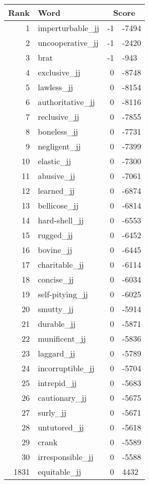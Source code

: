 \begin{longtable}[!htbp]{| rlr@{.}l |}
    \hline
    \textbf{Rank} & \textbf{Word} & \multicolumn{2}{c|}{\textbf{Score}} \\
    \hline
    \endhead
    1 & imperturbable\_jj & -1 & -7494 \\
    2 & uncooperative\_jj & -1 & -2420 \\
    3 & brat & -1 & -943 \\
    4 & exclusive\_jj & 0 & -8748 \\
    5 & lawless\_jj & 0 & -8154 \\
    6 & authoritative\_jj & 0 & -8116 \\
    7 & reclusive\_jj & 0 & -7855 \\
    8 & boneless\_jj & 0 & -7731 \\
    9 & negligent\_jj & 0 & -7399 \\
    10 & elastic\_jj & 0 & -7300 \\
    11 & abusive\_jj & 0 & -7061 \\
    12 & learned\_jj & 0 & -6874 \\
    13 & bellicose\_jj & 0 & -6814 \\
    14 & hard-shell\_jj & 0 & -6553 \\
    15 & rugged\_jj & 0 & -6452 \\
    16 & bovine\_jj & 0 & -6445 \\
    17 & charitable\_jj & 0 & -6114 \\
    18 & concise\_jj & 0 & -6034 \\
    19 & self-pitying\_jj & 0 & -6025 \\
    20 & smutty\_jj & 0 & -5914 \\
    21 & durable\_jj & 0 & -5871 \\
    22 & munificent\_jj & 0 & -5836 \\
    23 & laggard\_jj & 0 & -5789 \\
    24 & incorruptible\_jj & 0 & -5704 \\
    25 & intrepid\_jj & 0 & -5683 \\
    26 & cautionary\_jj & 0 & -5675 \\
    27 & surly\_jj & 0 & -5671 \\
    28 & untutored\_jj & 0 & -5618 \\
    29 & crank & 0 & -5589 \\
    30 & irresponsible\_jj & 0 & -5588 \\
    1831 & equitable\_jj & 0 & 4432 \\

\end{longtable}
